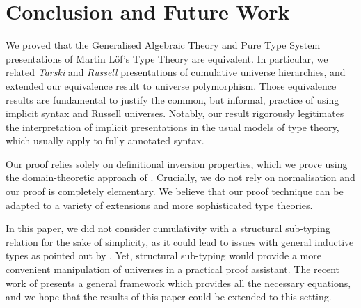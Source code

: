 \section{Conclusion and Future Work}

We proved that the Generalised Algebraic Theory and Pure Type System
presentations of Martin Löf's Type Theory are equivalent. In particular, we related 
\textit{Tarski} and \textit{Russell} presentations of cumulative universe hierarchies, and extended our equivalence result to universe polymorphism.
Those equivalence results are fundamental to justify the common, but informal, practice of using implicit syntax and Russell universes. Notably, our result rigorously legitimates the interpretation of implicit presentations in the usual models of type theory, which usually apply to fully annotated syntax.

Our proof relies solely on definitional inversion properties, which we prove using the domain-theoretic approach of \citet{definitional-inv}.  Crucially, we do not rely on normalisation and our proof is completely elementary. We believe that our proof technique can be adapted to a variety of extensions and more sophisticated type theories.

In this paper, we did not consider cumulativity with a structural sub-typing relation for the sake of simplicity, as it could lead to issues with general inductive types as pointed out by \citet{Luo}. Yet, structural sub-typing would provide a more convenient manipulation of universes in a practical proof assistant. The recent work of \citet{AdapTT} presents a general framework which provides all the necessary equations, and we hope that the results of this paper could be extended to this setting.
